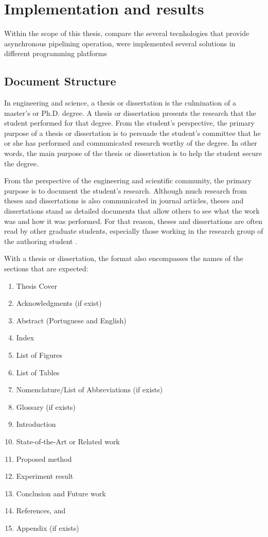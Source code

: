 \chapter{ Implementation and results }
\label{cha:a_short_latex_tutorial_with_examples}

Within the scope of this thesis,  compare the several tecnhologies that provide asynchronous pipelining operation, 
were implemented several solutions in different programming platforms

\section{Document Structure} %
\label{sec:document_structure}

In engineering and science, a thesis or dissertation is the culmination of a master's or Ph.D. degree. A thesis or dissertation presents the research that the student performed for that degree. From the student's perspective, the primary purpose of a thesis or dissertation is to persuade the student's committee that he or she has performed and communicated research worthy of the degree. In other words, the main purpose of the thesis or dissertation is to help the student secure the degree. 

From the perspective of the engineering and scientific community, the primary purpose is to document the student's research. Although much research from theses and dissertations is also communicated in journal articles, theses and dissertations stand as detailed documents that allow others to see what the work was and how it was performed. For that reason, theses and dissertations are often read by other graduate students, especially those working in the research group of the authoring student \cite{gustavii2016write, glasman2010science, chicago, strunk}. 
	
With a thesis or dissertation, the format also encompasses the names of the sections that are expected: 
\begin{enumerate}
\item Thesis Cover
\item Acknowledgments (if exist)
\item Abstract (Portuguese and English)
\item Index
\item List of Figures
\item List of Tables
\item Nomenclature/List of Abbreviations (if exists)
\item Glossary (if exists)
\item Introduction
\item State-of-the-Art or Related work
\item Proposed method
\item Experiment result
\item Conclusion and Future work
\item References, and 
\item Appendix (if exists)
\end{enumerate}
 
